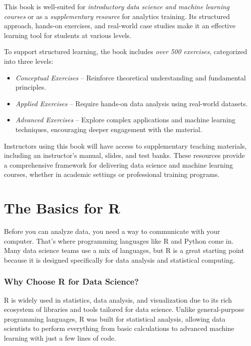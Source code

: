 \documentclass[
]{book}
\providecommand{\tightlist}{%
  \setlength{\itemsep}{0pt}\setlength{\parskip}{0pt}}
\theoremstyle{definition}
\theoremstyle{definition}
\theoremstyle{definition}
\theoremstyle{definition}
\theoremstyle{remark}
\begin{document}
This book is well-suited for \emph{introductory data science and machine learning courses} or as a \emph{supplementary resource} for analytics training. Its structured approach, hands-on exercises, and real-world case studies make it an effective learning tool for students at various levels.

To support structured learning, the book includes \emph{over 500 exercises}, categorized into three levels:

\begin{itemize}
\tightlist
\item
  \emph{Conceptual Exercises} -- Reinforce theoretical understanding and fundamental principles.\\
\item
  \emph{Applied Exercises} -- Require hands-on data analysis using real-world datasets.\\
\item
  \emph{Advanced Exercises} -- Explore complex applications and machine learning techniques, encouraging deeper engagement with the material.
\end{itemize}

Instructors using this book will have access to supplementary teaching materials, including an instructor's manual, slides, and test banks. These resources provide a comprehensive framework for delivering data science and machine learning courses, whether in academic settings or professional training programs.

\chapter{The Basics for R}\label{chapter-into-R}

Before you can analyze data, you need a way to communicate with your computer. That's where programming languages like R and Python come in. Many data science teams use a mix of languages, but R is a great starting point because it is designed specifically for data analysis and statistical computing.

\subsection*{Why Choose R for Data Science?}\label{why-choose-r-for-data-science}

R is widely used in statistics, data analysis, and visualization due to its rich ecosystem of libraries and tools tailored for data science. Unlike general-purpose programming languages, R was built for statistical analysis, allowing data scientists to perform everything from basic calculations to advanced machine learning with just a few lines of code.
\end{document}
